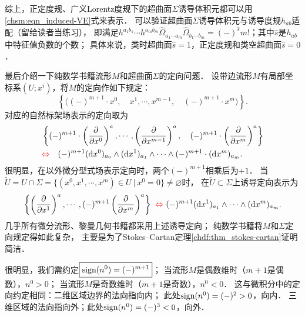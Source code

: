 综上，正定度规、广义Lorentz度规下的超曲面$\Sigma$诱导体积元都可以用\eqref{chsm:eqn_induced-VE}式来表示．
可以验证超曲面$\Sigma$诱导体积元与诱导度规$h_{ab}$适配（留给读者当练习），
即满足$h^{a_1b_1}\cdots h^{a_{m}b_{m}} \hat{\Omega}_{a_1 \cdots a_{m}} \hat{\Omega}_{b_1 \cdots b_{m}}
= (-)^{\hat{s}} m!$；其中$\hat{s}$是$h_{ab}$中特征值负数的个数；
具体来说，类时超曲面$\hat{s}=1$，正定度规和类空超曲面$\hat{s}=0$．



最后介绍一下纯数学书籍\cite[\S 1.8]{chen-li-2023-2ed-v1}流形$M$和超曲面$\Sigma$的定向问题．
设带边流形$M$有局部坐标系$(U;x^i)$，将$M$的定向作如下规定： 
\begin{equation}
  \left\{\bigl((-)^{m+1}\cdot x^0,\quad x^1,\cdots,x^{m-1},\quad (-)^{m+1}\cdot x^m \bigr)\right\}.
\end{equation}
对应的自然标架场表示的定向取为
\begin{subequations}\label{chsm:eqn_induced-orientation-nt}
\begin{align}
    &\left\{ (-)^{m+1}\cdot \left(\frac{\partial }{\partial x^0}\right)^a, \cdots,
    \left(\frac{\partial }{\partial x^{m-1}}\right)^a, \quad 
     (-)^{m+1}\cdot \left(\frac{\partial }{\partial x^m}\right)^a \right\} \\
    &{\color{red}\Leftrightarrow\quad } 
    (-)^{m+1} ( {\rm d}x^0)_{a_0} \wedge ({\rm d}x^1)_{a_1} \wedge \cdots\wedge (-)^{m+1}\cdot({\rm d}x^m)_{a_m}.
\end{align}
\end{subequations}
很明显，在以外微分型式场表示定向时，两个$(-)^{m+1}$相乘后为$+1$．
当$\widetilde{U}=U\cap \Sigma =\{(x^0,x^1,\cdots,x^m)\in U \ | \ x^0=0 \}\neq \varnothing $时，
在$\widetilde{U}\subset \Sigma$上{\heiti 诱导定向}表示为
\setlength{\mathindent}{0em}
\begin{equation}\label{chsm:eqn_induced-orientation-nc}
    \left\{
    \left(\frac{\partial }{\partial x^1}\right)^a,\cdots,
    (-)^{m+1} \left(\frac{\partial }{\partial x^{m}}\right)^a\right\}
    {\ \color{red}\Leftrightarrow \   } 
    (-)^{m+1} ({\rm d}x^1)_{a_1} \wedge \cdots\wedge({\rm d}x^{m})_{a_{m}}.
\end{equation}\setlength{\mathindent}{2em}
几乎所有微分流形、黎曼几何书籍都采用上述诱导定向；
纯数学书籍将$M$和$\Sigma$定向规定得如此复杂，
主要是为了Stokes--Cartan定理\ref{chdf:thm_stokes-cartan}证明简洁．

很明显，我们需约定$\boxed{{\rm sign}(n^0)=(-)^{m+1}}$；
当流形$M$是偶数维时（$m+1$是偶数），$n^0 > 0$；
当流形$M$是奇数维时（$m+1$是奇数），$n^0 < 0$．
这与微积分中的定向约定相同：二维区域边界的法向指向内；
此处${\rm sign}(n^0)=(-)^{2}>0$，向内．
三维区域的法向指向外；此处${\rm sign}(n^0)=(-)^{3}<0$，向外．


